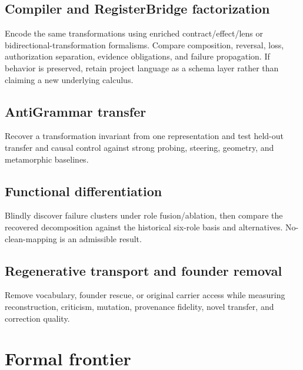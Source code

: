 \subsection{Compiler and RegisterBridge factorization}
Encode the same transformations using enriched contract/effect/lens or bidirectional-transformation formalisms. Compare composition, reversal, loss, authorization separation, evidence obligations, and failure propagation. If behavior is preserved, retain project language as a schema layer rather than claiming a new underlying calculus.

\subsection{AntiGrammar transfer}
Recover a transformation invariant from one representation and test held-out transfer and causal control against strong probing, steering, geometry, and metamorphic baselines.

\subsection{Functional differentiation}
Blindly discover failure clusters under role fusion/ablation, then compare the recovered decomposition against the historical six-role basis and alternatives. No-clean-mapping is an admissible result.

\subsection{Regenerative transport and founder removal}
Remove vocabulary, founder rescue, or original carrier access while measuring reconstruction, criticism, mutation, provenance fidelity, novel transfer, and correction quality.

\section{Formal frontier}

